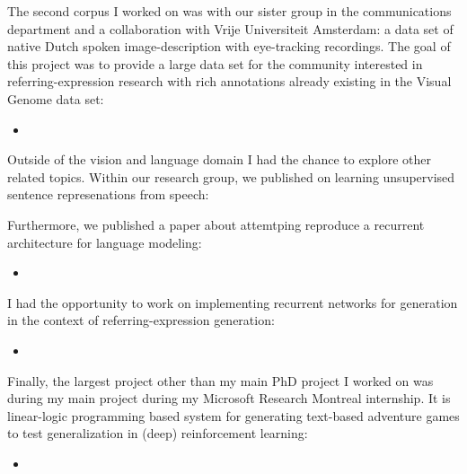 The second corpus I worked on was with our sister group in the communications department and a collaboration with 
Vrije Universiteit Amsterdam:  a data set of native Dutch spoken image-description with eye-tracking recordings.
The goal of this project was to provide a large data set for the community interested in referring-expression research with rich annotations already existing in the Visual Genome data set:

\begin{itemize}
\item {}
\end{itemize}

Outside of the vision and language domain I had the chance to explore other related topics.
Within our research group, we published on learning unsupervised sentence represenations
from speech:

\item {}

Furthermore, we published a paper about attemtping reproduce a 
recurrent architecture for language modeling:

\begin{itemize}
\item {}
\end{itemize}

I had the opportunity to work on implementing recurrent networks for
generation in the context of referring-expression generation:

\begin{itemize}
\item {}
\end{itemize}


Finally, the largest project other than my main PhD project I worked
on was during my main project during my Microsoft Research Montreal internship.
It is linear-logic programming based system for 
generating text-based adventure games to test
generalization in (deep) reinforcement learning:

\begin{itemize}
\item {}
\end{itemize}




